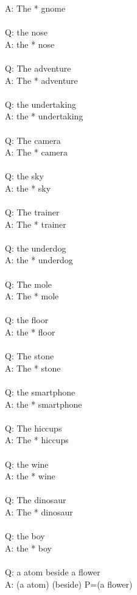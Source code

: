 \documentclass{article} \usepackage{iclr2022_conference,times}
\begin{document}
{A: The * gnome \\
 \\
Q: the nose \\
A: the * nose \\
 \\
Q: The adventure \\
A: The * adventure \\
 \\
Q: the undertaking \\
A: the * undertaking \\
 \\
Q: The camera \\
A: The * camera \\
 \\
Q: the sky \\
A: the * sky \\
 \\
Q: The trainer \\
A: The * trainer \\
 \\
Q: the underdog \\
A: the * underdog \\
 \\
Q: The mole \\
A: The * mole \\
 \\
Q: the floor \\
A: the * floor \\
 \\
Q: The stone \\
A: The * stone \\
 \\
Q: the smartphone \\
A: the * smartphone \\
 \\
Q: The hiccups \\
A: The * hiccups \\
 \\
Q: the wine \\
A: the * wine \\
 \\
Q: The dinosaur \\
A: The * dinosaur \\
 \\
Q: the boy \\
A: the * boy \\
 \\
Q: a atom beside a flower \\
A: (a atom) (beside) P=(a flower) \\
}
\end{document}
